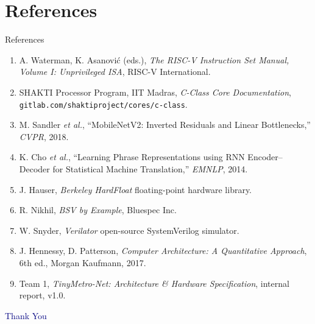 \documentclass[aspectratio=169,11pt]{beamer}
\begin{document}
\section{References}
\begin{frame}[allowframebreaks]{References}
  \footnotesize
  \begin{enumerate}
    \item A. Waterman, K. Asanovi\'c (eds.), \emph{The RISC-V Instruction Set
          Manual, Volume I: Unprivileged ISA}, RISC-V International.
    \item SHAKTI Processor Program, IIT Madras, \emph{C-Class Core Documentation},
          \texttt{gitlab.com/shaktiproject/cores/c-class}.
    \item M. Sandler \emph{et al.}, ``MobileNetV2: Inverted Residuals and Linear
          Bottlenecks,'' \emph{CVPR}, 2018.
    \item K. Cho \emph{et al.}, ``Learning Phrase Representations using RNN
          Encoder--Decoder for Statistical Machine Translation,'' \emph{EMNLP}, 2014.
    \item J. Hauser, \emph{Berkeley HardFloat} floating-point hardware library.
    \item R. Nikhil, \emph{BSV by Example}, Bluespec Inc.
    \item W. Snyder, \emph{Verilator} open-source SystemVerilog simulator.
    \item J. Hennessy, D. Patterson, \emph{Computer Architecture: A Quantitative
          Approach}, 6th ed., Morgan Kaufmann, 2017.
    \item Team 1, \emph{TinyMetro-Net: Architecture \& Hardware Specification},
          internal report, v1.0.
  \end{enumerate}
\end{frame}

\begin{frame}
  \centering
  \Huge\textcolor{navy}{Thank You}
\end{frame}
\end{document}
